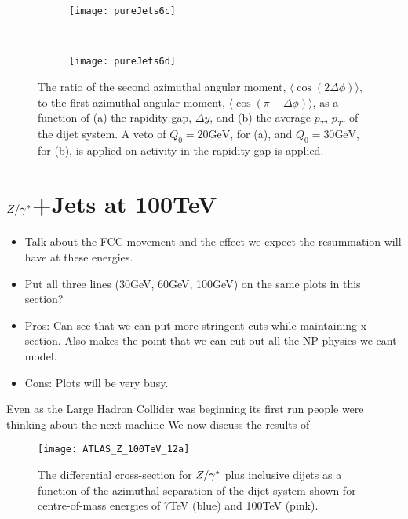 	\begin{figure}[bth]
		\begin{subfigure}[b]{0.48\textwidth}
			\texttt{[image: pureJets6c]}
			\caption{}
			\label{fig:}
		\end{subfigure}
		~
		\begin{subfigure}[b]{0.48\textwidth}
			\texttt{[image: pureJets6d]}
			\caption{}
			\label{fig:}
		\end{subfigure}
		\caption{The ratio of the second azimuthal angular moment,
		$\langle \cos(2\Delta\phi)\rangle$, to the first azimuthal angular moment,
		$\langle \cos(\pi-\Delta\phi)\rangle$, as a function of (a) the rapidity gap,
		$\Delta y$, and (b) the average $p_T$, $\overline{p_T}$, of the dijet system.  A
		veto of $Q_0=20\text{GeV}$, for (a), and $Q_0=30\text{GeV}$, for (b), is applied
		on activity in the rapidity gap is applied.}
		\label{fig:atlasPJ6}
	\end{figure}

\chapter{$Z/\gamma^*$+Jets at 100TeV}
\label{chap:100TeV}

	\begin{itemize}
		\item Talk about the FCC movement and the effect we expect the resummation will have at these energies.
		\item Put all three lines (30GeV, 60GeV, 100GeV) on the same plots in this section?
		\item Pros: Can see that we can put more stringent cuts while maintaining x-section.  Also
		      makes the point that we can cut out all the NP physics we cant model.
		\item Cons: Plots will be very busy.
	\end{itemize}

	Even as the Large Hadron Collider was beginning its first run people were thinking about the next machine
	We now discuss the results of

	\begin{figure}[h]
		\centering
		\texttt{[image: ATLAS\_Z\_100TeV\_12a]}
		\caption{The differential cross-section for $Z/\gamma^*$ plus inclusive dijets as a
		function of the azimuthal separation of the dijet system shown for centre-of-mass
		energies of 7TeV (blue) and 100TeV (pink).}
		\label{fig:100tev_12a}
	\end{figure}

